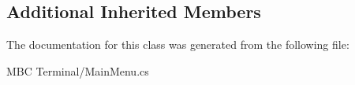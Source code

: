 \subsection*{Additional Inherited Members}


The documentation for this class was generated from the following file\-:\begin{DoxyCompactItemize}
\item 
M\-B\-C Terminal/Main\-Menu.\-cs\end{DoxyCompactItemize}
